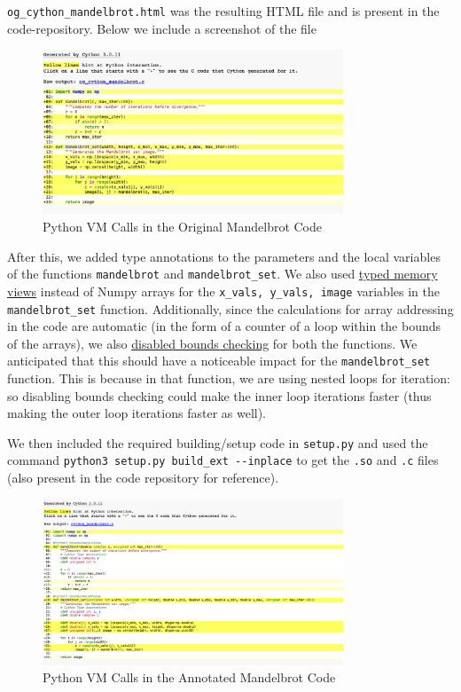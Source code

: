 \documentclass[a4paper,12pt]{article}
\begin{document}
\verb|og_cython_mandelbrot.html| was the resulting HTML file and is present in the code-repository. Below we include a screenshot of the file

\begin{figure}[H]
  \centering
  \includegraphics[width=0.8\textwidth]{images/og_mandelbrot_cython.png}
  \caption{Python VM Calls in the Original Mandelbrot Code}
\end{figure}

After this, we added type annotations to the parameters and the local variables of the functions \verb|mandelbrot| and \verb|mandelbrot_set|. We also used \underline{typed memory views} instead of Numpy arrays for the \verb|x_vals, y_vals, image| variables in the \verb|mandelbrot_set| function. Additionally, since the calculations for array addressing in the code are automatic (in the form of a counter of a loop within the bounds of the arrays), we also \underline{disabled bounds checking} for both the functions. We anticipated that this should have a noticeable impact for the \verb|mandelbrot_set| function. This is because in that function, we are using nested loops for iteration: so disabling bounds checking could make the inner loop iterations faster (thus making the outer loop iterations faster as well). 

We then included the required building/setup code in \verb|setup.py| and used the command \verb|python3 setup.py build_ext --inplace| to get the \verb|.so| and \verb|.c| files (also present in the code repository for reference). 

\begin{figure}[H]
  \centering
  \includegraphics[width=0.8\textwidth]{images/after_annotate_mandelbrot.png}
  \caption{Python VM Calls in the Annotated Mandelbrot Code}
\end{figure}
\end{document}
